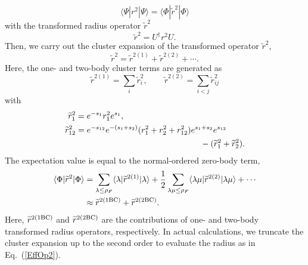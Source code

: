 \documentclass[aps,prc, dvips, twocolumn,groupedaddress,showkeys,showpacs,floatfix,superscriptaddress]{revtex4-1}
\newcommand{\<}{\langle}
\renewcommand{\>}{\rangle}
\begin{document}
\begin{equation}
  \<\Psi|r^{2}|\Psi\> = \<\Phi|\widetilde{r}^{2}|\Phi\>
\end{equation}
with the transformed radius operator $\widetilde{r}^{2}$
\begin{equation}
  \widetilde{r}^{2} = U^{\dag}r^{2} U.
\end{equation}
Then, we carry out the cluster expansion of the transformed operator $\widetilde{r}^{2}$,
\begin{equation}
  \widetilde{r}^{2}=  \widetilde{r}^{2(1)}+
  \widetilde{r}^{2(2)} + \cdots.
\end{equation}
Here, the one- and two-body cluster terms are generated as
\begin{equation}
  \widetilde{r}^{2(1)}= \sum_{i}\widetilde{r}_{i}^{2}, \qquad
  \widetilde{r}^{2(2)}= \sum_{i<j}\widetilde{r}_{ij}^{2}
\end{equation}
with
\begin{align}
  \widetilde{r}_{1}^{2} &= e^{-s_{1}}r_{1}^{2} e^{s_{1}}, \\
  \widetilde{r}_{12}^{2} &= e^{-s_{12}}e^{-(s_{1}+s_{2})} (r_{1}^{2}+r_{2}^{2}+r_{12}^{2})
  e^{s_{1}+s_{2}}e^{s_{12}} \notag \\
  & \hspace{15em}- (\widetilde{r}_{1}^{2}+\widetilde{r}_{2}^{2}).
\end{align}
The expectation value is equal to the normal-ordered zero-body term,
\begin{align}
  \<\Phi|\widetilde{r}^{2}|\Phi\>
&= \sum_{\lambda \le \rho_{F}}
  \<\lambda|\widetilde{r}^{2(1)}|\lambda\> +
 \frac{1}{2}\sum_{\lambda\mu\le\rho_{F}}
 \<\lambda\mu|\widetilde{r}^{2(2)}|\lambda\mu\> + \cdots \nonumber \\
 \label{EffOp2}
  & \approx \widetilde{r}^{2 ({\rm 1BC})} + \widetilde{r}^{2({\rm 2BC})}.
\end{align}
Here, $\widetilde{r}^{2 ({\rm 1BC})}$ and $\widetilde{r}^{2 ({\rm 2BC})}$
 are the contributions of one- and two-body transformed radius operators, respectively.
In actual calculations, we truncate the cluster expansion up to the second order to evaluate the radius as in Eq.~(\ref{EffOp2}).
\end{document}
